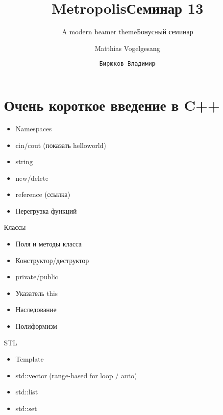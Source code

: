 \documentclass[10pt]{beamer}
\title{Metropolis}
\subtitle{A modern beamer theme}
\date{}
\author{Matthias Vogelgesang}
\institute{Center for modern beamer themes}
\title{Семинар 13}
\subtitle{Бонусный семинар}
\author{\texttt{Бирюков Владимир}}
\institute{МФТИ}
\begin{document}
%
%

\maketitle


%
%

\section{Очень короткое введение в C++}

\begin{frame}{}
\begin{itemize}
\item Namespaces
\item cin/cout (показать helloworld)
\item string
\item new/delete
\item reference (ссылка)
\item Перегрузка функций
\end{itemize}
\end{frame}

\begin{frame}{Классы}
\begin{itemize}
\item Поля и методы класса
\item Конструктор/деструктор
\item private/public
\item Указатель this
\item Наследование
\item Полиформизм
\end{itemize}
\end{frame}


\begin{frame}{STL}
\begin{itemize}
\item Template
\item std::vector (range-based for loop / auto)
\item std::list
\item std::set
\end{itemize}
\end{frame}
\end{document}

